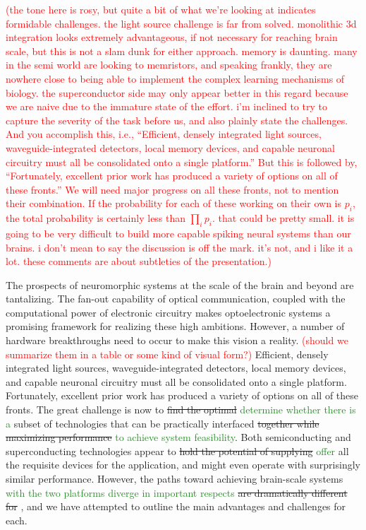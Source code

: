 \documentclass[twocolumn]{article}
\begin{document}
\textcolor{red}{(the tone here is rosy, but quite a bit of what we're looking at indicates formidable challenges. the light source challenge is far from solved. monolithic 3d integration looks extremely advantageous, if not necessary for reaching brain scale, but this is not a slam dunk for either approach. memory is daunting. many in the semi world are looking to memristors, and speaking frankly, they are nowhere close to being able to implement the complex learning mechanisms of biology. the superconductor side may only appear better in this regard because we are naive due to the immature state of the effort. i'm inclined to try to capture the severity of the task before us, and also plainly state the challenges. And you accomplish this, i.e., ``Efficient, densely integrated light sources, waveguide-integrated detectors, local memory devices, and capable neuronal circuitry must all be consolidated onto a single platform.'' But this is followed by, ``Fortunately, excellent prior work has produced a variety of options on all of these fronts.'' We will need major progress on all these fronts, not to mention their combination. If the probability for each of these working on their own is $p_i$, the total probability is certainly less than $\prod_i p_i$. that could be pretty small. it is going to be very difficult to build more capable spiking neural systems than our brains. i don't mean to say the discussion is off the mark. it's not, and i like it a lot. these comments are about subtleties of the presentation.)}

The prospects of neuromorphic systems at the scale of the brain and beyond are tantalizing. The fan-out capability of optical communication, coupled with the computational power of electronic circuitry makes optoelectronic systems a promising framework for realizing these high ambitions. However, a number of hardware breakthroughs need to occur to make this vision a reality. \textcolor{red}{(should we summarize them in a table or some kind of visual form?)} Efficient, densely integrated light sources, waveguide-integrated detectors, local memory devices, and capable neuronal circuitry must all be consolidated onto a single platform. Fortunately, excellent prior work has produced a variety of options on all of these fronts. The great challenge is now to \sout{find the optimal} \textcolor{ForestGreen}{determine whether there is a} subset of technologies that can be practically interfaced \sout{together while maximizing performance} \textcolor{ForestGreen}{to achieve system feasibility}. Both semiconducting and superconducting technologies appear to \sout{hold the potential of supplying} \textcolor{ForestGreen}{offer} all the requisite devices for the application, and might even operate with surprisingly similar performance. However, the \textcolor{techological} paths toward achieving brain-scale systems \textcolor{ForestGreen}{with the two platforms diverge in important respects} \sout{are dramatically different for} , and we have attempted to outline the main advantages and challenges for each. 
\end{document}
